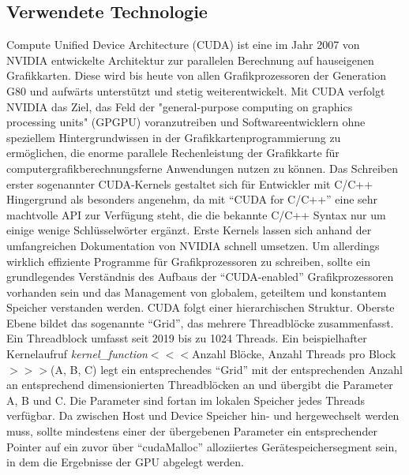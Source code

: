 \documentclass[12pt, onecolumn, notitlepage]{scrartcl}
\begin{document}
\subsection{Verwendete Technologie}
Compute Unified Device Architecture (CUDA) ist eine im Jahr 2007 von NVIDIA entwickelte Architektur zur parallelen
Berechnung auf hauseigenen Grafikkarten. Diese wird bis heute von allen Grafikprozessoren der Generation G80 und aufwärts unterstützt 
und stetig weiterentwickelt. Mit CUDA verfolgt NVIDIA das Ziel, das Feld der "general-purpose computing on graphics processing units" (GPGPU) 
voranzutreiben und Softwareentwicklern ohne speziellem Hintergrundwissen in der Grafikkartenprogrammierung zu ermöglichen, die enorme parallele Rechenleistung 
der Grafikkarte für computergrafikberechnungsferne Anwendungen nutzen zu können. \newline
Das Schreiben erster sogenannter CUDA-Kernels gestaltet sich 
für Entwickler mit C/C++ Hingergrund als besonders angenehm, da mit \enquote{CUDA for C/C++} eine sehr machtvolle API zur Verfügung steht, die
die bekannte C/C++ Syntax nur um einige wenige Schlüsselwörter ergänzt. \newline 
Erste Kernels lassen sich anhand der umfangreichen Dokumentation von NVIDIA 
schnell umsetzen. Um allerdings wirklich effiziente Programme für Grafikprozessoren zu schreiben, sollte ein grundlegendes Verständnis des Aufbaus der 
\enquote{CUDA-enabled} Grafikprozessoren vorhanden sein und das Management von globalem, geteiltem und konstantem Speicher verstanden werden.\newline
CUDA folgt einer hierarchischen Struktur. Oberste Ebene bildet das sogenannte \enquote{Grid}, das mehrere Threadblöcke zusammenfasst. Ein Threadblock umfasst seit 2019 bis zu 1024 Threads.
Ein beispielhafter Kernelaufruf \newline
\newline
\textit{kernel\_function}$<<<$Anzahl Blöcke, Anzahl Threads pro Block$>>>$(A, B, C) \newline
\newline
legt ein entsprechendes 
\enquote{Grid} mit der entsprechenden Anzahl an entsprechend dimensionierten Threadblöcken an und übergibt die Parameter A, B und C. Die Parameter sind fortan im lokalen Speicher jedes Threads verfügbar.
Da zwischen Host und Device Speicher hin- und hergewechselt werden muss, sollte mindestens einer der übergebenen Parameter ein entsprechender Pointer auf ein zuvor über \enquote{cudaMalloc} alloziiertes Gerätespeichersegment sein, in dem die Ergebnisse der GPU abgelegt werden. 
\end{document}
